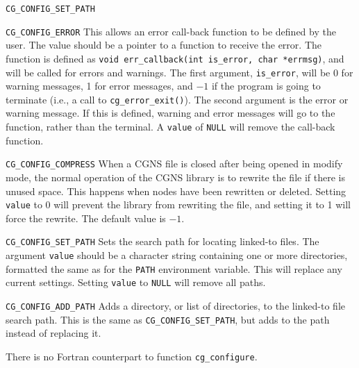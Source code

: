 \begin{Ventryi}{\texttt{CG\_CONFIG\_SET\_PATH}}
\item [\texttt{CG\_CONFIG\_ERROR}]
      This allows an error call-back function to be defined by the
      user.
      The value should be a pointer to a function to receive the error.
      The function is defined as \texttt{void err\_callback(int is\_error,
      char *errmsg)}, and will be called for errors and warnings.
      The first argument, \texttt{is\_error}, will be 0 for warning
      messages, 1 for error messages, and $-1$ if the program is
      going to terminate (i.e., a call to \texttt{cg\_error\_exit()}).
      The second argument is the error or warning message.
      If this is defined, warning and error messages will go to the
      function, rather than the terminal.
      A \texttt{value} of \texttt{NULL} will remove the call-back
      function.
\item [\texttt{CG\_CONFIG\_COMPRESS}]
      When a CGNS file is closed after being opened in modify mode, the
      normal operation of the CGNS library is to rewrite the file if
      there is unused space.
      This happens when nodes have been rewritten or deleted.
      Setting \texttt{value} to 0 will prevent the library from
      rewriting the file, and setting it to 1 will force the rewrite.
      The default value is $-1$.
\item [\texttt{CG\_CONFIG\_SET\_PATH}]
      Sets the search path for locating linked-to files.
      The argument \texttt{value} should be a character string
      containing one or more directories, formatted the same as for the
      \texttt{PATH} environment variable.
      This will replace any current settings.
      Setting \texttt{value} to \texttt{NULL} will remove all paths.
\item [\texttt{CG\_CONFIG\_ADD\_PATH}]
      Adds a directory, or list of directories, to the linked-to file
      search path.
      This is the same as \texttt{CG\_CONFIG\_SET\_PATH}, but adds to
      the path instead of replacing it.
\end{Ventryi}

There is no Fortran counterpart to function \texttt{cg\_configure}.

